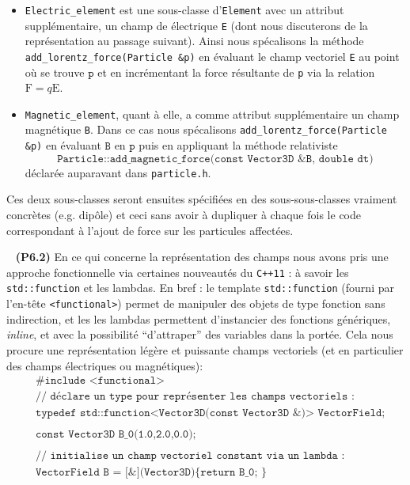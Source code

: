 \documentclass[12pt, letterpaper, twoside]{article}
\newcommand{\T}[1]{\texttt{#1}}
\begin{document}
\begin{itemize}
\item \T{Electric\_element} est une sous-classe d'\T{Element} avec un attribut supplémentaire, un champ de électrique \T{E} (dont nous discuterons de la représentation au passage suivant). Ainsi nous spécalisons la méthode \T{add\_lorentz\_force(Particle \&p)} en évaluant le champ vectoriel \T{E} au point où se trouve $\T{p}$ et en incrémentant la force résultante de \T{p} via la relation $\boldsymbol{\mathrm{F}}=q\boldsymbol{\mathrm{E}}$.

\item \T{Magnetic\_element}, quant à elle, a comme attribut supplémentaire un champ magnétique \T{B}. Dans ce cas nous spécalisons \T{add\_lorentz\_force(Particle \&p)} en évaluant $\T{B}$ en $\T{p}$ puis en appliquant la méthode relativiste $$\T{Particle::add\_magnetic\_force(const Vector3D \&B, double dt)}$$ déclarée auparavant dans \T{particle.h}.

\end{itemize}

\noindent Ces deux sous-classes seront ensuites spécifiées en des sous-sous-classes vraiment concrètes (e.g. dipôle) et ceci sans avoir à dupliquer à chaque fois le code correspondant à l'ajout de force sur les particules affectées.

\ \linebreak
\textbf{(P6.2)} En ce qui concerne la représentation des champs nous avons pris une approche fonctionnelle via certaines nouveautés du \T{C++11} : à savoir les \T{std::function} et les lambdas. En bref : le template \T{std::function} (fourni par l'en-tête \T{<functional>}) permet de manipuler des objets de type fonction sans indirection, et les les lambdas permettent d'instancier des fonctions génériques, \textit{inline}, et avec la possibilité ``d'attraper'' des variables dans la portée. Cela nous procure une représentation légère et puissante champs vectoriels (et en particulier des champs électriques ou magnétiques):
\begin{align*}
	&\T{\#include <functional>}\\
	&\T{// déclare un type pour représenter les champs vectoriels : }\\
	&\T{typedef std::function<Vector3D(const Vector3D \&)> VectorField;}\\ \\
	&\T{const Vector3D B\_0(1.0,2.0,0.0);}\\ \\
	&\T{// initialise un champ vectoriel constant via un lambda : }\\
	&\T{VectorField B = [\&](Vector3D)\{ return B\_0; \}}
\end{align*}
\end{document}
